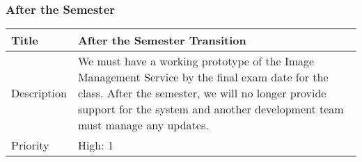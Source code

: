 \subsubsection{After the Semester}
  \begin{table}[h!]
    \label{system-constraints/transition-support-constraints/after-table}
    \begin{tabularx}{\textwidth}{|l|X|}
      \hline
      Title       & After the Semester Transition\\ \hline
      Description & We must have a working prototype of the Image Management
		Service by the final exam date for the class. After the semester, we
		 will no longer provide support for the system and another 
		development team must manage any updates.
                    \\ \hline
      Priority    & High: 1 \\ \hline
    \end{tabularx}
  \end{table}
